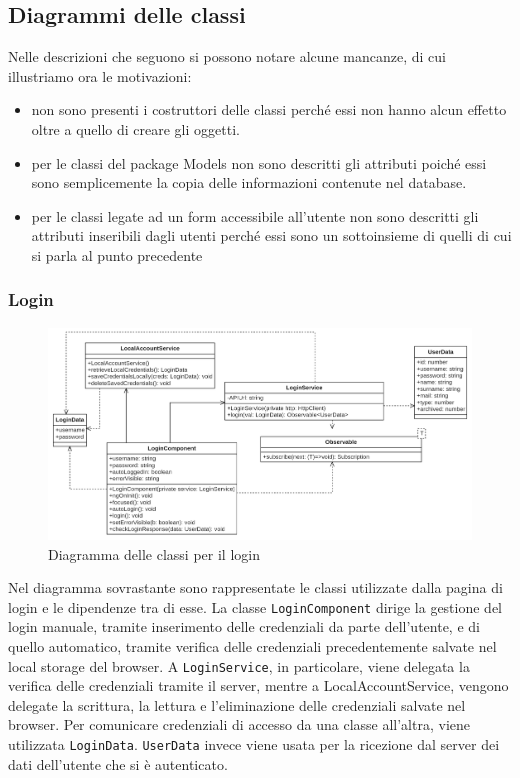 \subsection{Diagrammi delle classi}
Nelle descrizioni che seguono si possono notare alcune mancanze, di cui illustriamo ora le motivazioni:
\begin{itemize}
	\item non sono presenti i costruttori delle classi perché essi non hanno alcun effetto oltre a quello di creare gli oggetti.
	\item per le classi del package Models non sono descritti gli attributi poiché essi sono semplicemente la copia delle informazioni contenute nel database.
	\item per le classi legate ad un form accessibile all'utente non sono descritti gli attributi inseribili dagli utenti perché essi sono un sottoinsieme di quelli di cui si parla al punto precedente
\end{itemize}

\subsubsection{Login}
\begin{figure}[H]
	\centering
	\includegraphics[width=18cm]{res/images/webapp-login-diagrammaClassi.png}
	\caption{Diagramma delle classi per il login}
	\label{fig:DiagrammaClassiLogin}
\end{figure}
Nel diagramma sovrastante sono rappresentate le classi utilizzate dalla pagina di login e le dipendenze tra di esse. La classe \texttt{LoginComponent} dirige la gestione del login manuale, tramite inserimento delle credenziali da parte dell'utente, e di quello automatico, tramite verifica delle credenziali precedentemente salvate nel local storage del browser. A \texttt{LoginService}, in particolare, viene delegata la verifica delle credenziali tramite il server, mentre a LocalAccountService, vengono delegate la scrittura, la lettura e l'eliminazione delle credenziali salvate nel browser. Per comunicare credenziali di accesso da una classe all'altra, viene utilizzata \texttt{LoginData}. \texttt{UserData} invece viene usata per la ricezione dal server dei dati dell'utente che si è autenticato.

